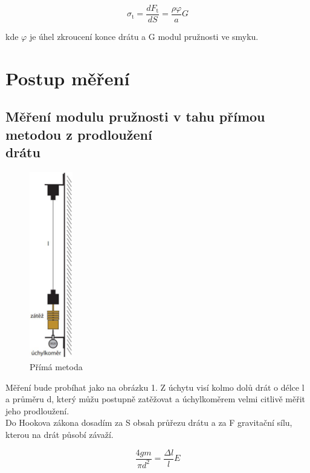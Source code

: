 \documentclass[a4paper,11pt]{article}
\begin{document}
\begin{equation}
  \sigma_{\text{t}} = \frac{dF_{\text{t}}}{dS} = \frac{\rho \varphi}{a} G
\end{equation}

\noindent
kde $\varphi$ je úhel zkroucení konce drátu a G modul pružnosti ve smyku. 

\section{Postup měření}

\subsection{Měření modulu pružnosti v tahu přímou metodou z prodloužení \\ drátu}

\begin{figure}
  \vspace{-9.5em}
  \centering
  \includegraphics[width=53pt]{uchylkomer.jpg}
  \caption{Přímá metoda}
\end{figure}

  \vspace{1em}
Měření bude probíhat jako na obrázku 1. Z úchytu visí kolmo dolů drát o délce l a průměru d, který můžu postupně zatěžovat a úchylkoměrem  velmi citlivě měřit jeho prodloužení. \\

  Do Hookova zákona dosadím za S obsah průřezu drátu a za F gravitační sílu, kterou na drát působí závaží.

\begin{equation}
 \frac{4 g m}{\pi d^2} = \frac{\Delta l}{l} E
\end{equation}
\end{document}
